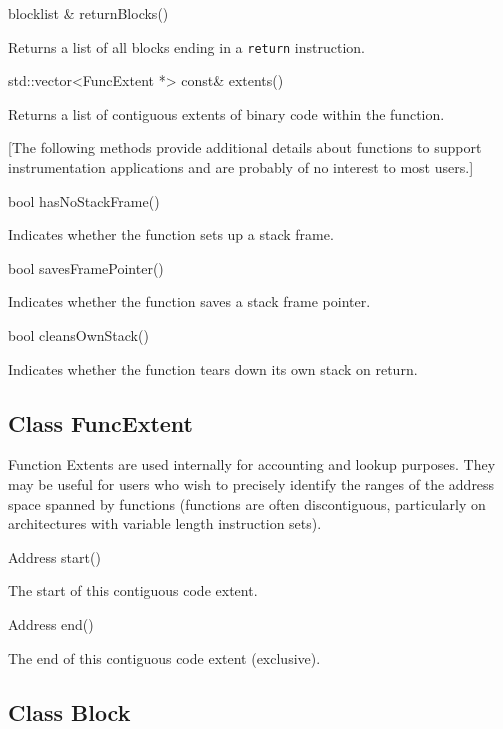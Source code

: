 \documentclass{article}
\newenvironment{apient}{\small\verbatim}{\endverbatim}
\newcommand{\apidesc}[1]{%
{\addtolength{\leftskip}{4em}%
#1\par\medskip}
}
\begin{document}
\begin{apient}
blocklist & returnBlocks()
\end{apient}
\apidesc{Returns a list of all blocks ending in a \texttt{return} instruction.}

\begin{apient}
std::vector<FuncExtent *> const& extents()
\end{apient}
\apidesc{Returns a list of contiguous extents of binary code within the function.}

[The following methods provide additional details about functions to support instrumentation applications and are probably of no interest to most users.]

\begin{apient}
bool hasNoStackFrame()
\end{apient}
\apidesc{Indicates whether the function sets up a stack frame.}

\begin{apient}
bool savesFramePointer()
\end{apient}
\apidesc{Indicates whether the function saves a stack frame pointer.}

\begin{apient}
bool cleansOwnStack()
\end{apient}
\apidesc{Indicates whether the function tears down its own stack on return.}

\subsection{Class FuncExtent}

Function Extents are used internally for accounting and lookup purposes. They may be useful for users who wish to precisely identify the ranges of the address space spanned by functions (functions are often discontiguous, particularly on architectures with variable length instruction sets).

\begin{apient}
Address start()
\end{apient}
\apidesc{The start of this contiguous code extent.}

\begin{apient}
Address end()
\end{apient}
\apidesc{The end of this contiguous code extent (exclusive).}

\subsection{Class Block}
\end{document}

